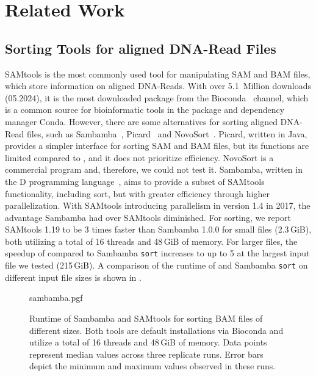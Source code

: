 \section{Related Work}

\subsection{Sorting Tools for aligned DNA-Read Files}
SAMtools is the most commonly used tool for manipulating SAM and BAM files, which store information on aligned DNA-Reads. With over 5.1~Million downloads (05.2024), it is the most downloaded package from the Bioconda~\cite{the_bioconda_team_bioconda_2018} channel, which is a common source for bioinformatic tools in the package and dependency manager Conda. However, there are some alternatives for sorting aligned DNA-Read files, such as Sambamba~\cite{tarasov_sambamba_2015}, Picard~\cite{Picard2019toolkit} and NovoSort~\cite{noauthor_novosort_nodate}. Picard, written in Java, provides a simpler interface for sorting SAM and BAM files, but its functions are limited compared to \sort, and it does not prioritize efficiency. NovoSort is a commercial program and, therefore, we could not test it. Sambamba, written in the D programming language~\cite{alexandrescu_d_2010}, aims to provide a subset of SAMtools functionality, including sort, but with greater efficiency through higher parallelization. With SAMtools introducing parallelism in version 1.4 in 2017, the advantage Sambamba had over SAMtools diminished. For sorting, we report SAMtools 1.19 to be 3 times faster than Sambamba 1.0.0 for small files (2.3\,GiB), both utilizing a total of 16 threads and 48\,GiB of memory. For larger files, the speedup of \sort compared to Sambamba \texttt{sort} increases to up to 5 at the largest input file we tested (215\,GiB). A comparison of the runtime of \sort and Sambamba \texttt{sort} on different input file sizes is shown in .
\begin{figure}[t]
        {sambamba.pgf}
    \caption{Runtime of Sambamba and SAMtools for sorting BAM files of different sizes. Both tools are default installations via Bioconda and utilize a total of 16 threads and 48\,GiB of memory. Data points represent median values across three replicate runs. Error bars depict the minimum and maximum values observed in these runs.}
    \label{fig:sambamba}
\end{figure}

